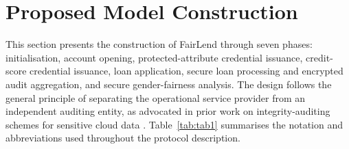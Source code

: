 \documentclass[a4paper,fleqn]{cas-dc}
\begin{document}
\section{Proposed Model Construction}


This section presents the construction of FairLend through seven phases: initialisation, account opening, protected-attribute credential issuance, credit-score credential issuance, loan application, secure loan processing and encrypted audit aggregation, and secure gender-fairness analysis. The design follows the general principle of separating the operational service provider from an independent auditing entity, as advocated in prior work on integrity-auditing schemes for sensitive cloud data \cite{kumar2023efficient}. Table~\ref{tab:tab1} summarises the notation and abbreviations used throughout the protocol description.
\end{document}
